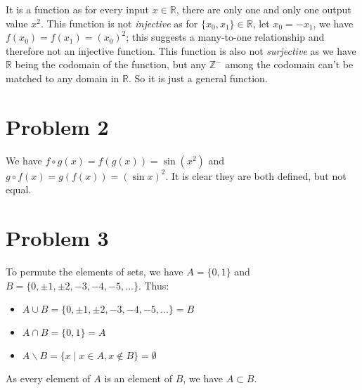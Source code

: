 \documentclass[11pt]{article}
\begin{document}
It is a function as for every input $x \in \mathbb{R}$, there are only one and only one output value $x^2$. This function is not \textit{injective} as for $\{x_0, x_1\} \in \mathbb{R}$, let $x_0 = -x_1$, we have $f(x_0) = f(x_1) = (x_0)^2$; this suggests a many-to-one relationship and therefore not an injective function. This function is also not \textit{surjective} as we have $\mathbb{R}$ being the codomain of the function, but any $\mathbb{Z^-}$ among the codomain can't be matched to any domain in  $\mathbb{R}$. So it is just a general function.

\section*{Problem 2}

We have $f \circ g(x) = f(g(x)) = \sin(x^2)$ and  $g \circ f(x) = g(f(x)) = (\sin x)^2$. It is clear they are both defined, but not equal.

\section*{Problem 3}

To permute the elements of sets, we have $A = \{0, 1\}$ and $B = \{0, \pm1, \pm2, -3, -4, -5, ...\}$. Thus:

\begin{itemize}
    \item $A \cup B = \{0, \pm1, \pm2, -3, -4, -5, ...\} = B$
    \item $A \cap B = \{0, 1\} = A$
    \item $A \backslash B = \{x \mid x \in A, x \not\in B\} = \emptyset$
\end{itemize}

\noindent As every element of $A$ is an element of $B$, we have $A \subset B$.
\end{document}
